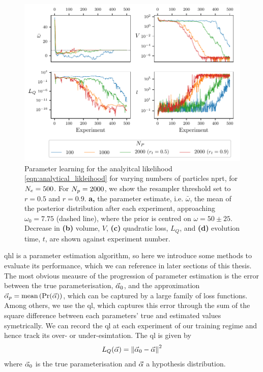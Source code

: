 \begin{figure}[t]
    \centering
    \includegraphics{algorithms/figures/params.pdf}
    \caption[Parameter learning varying number of particles]{
        Parameter learning for the analyitcal \gls{likelihood} \cref{eqn:analytical_likleihood}
        for varying numbers of \glspl{particle} \gls{nprt}, for $N_e=500$. 
        For $N_p=2000$, we show the resampler threshold set to $r=0.5$ and $r=0.9$. 
        \textbf{a,} the parameter estimate, i.e. $\bar{\omega}$, the mean of the posterior distribution after each experiment, 
        approaching $\omega_0=7.75$ (dashed line), where the prior is centred on $\omega=50 \pm 25$. 
        Decrease in \textbf{(b)} volume, $V$, \textbf{(c)} quadratic loss, $L_Q$, 
        and \textbf{(d)} evolution time, $t$, are shown against \gls{experiment} number.
        \figtableref
    }
    \label{fig:param_learning_vary_particles}
\end{figure}


\gls{qhl} is a parameter estimation algorithm, so here we introduce some methods to evaluate its performance, 
    which we can reference in later sections of this thesis. 
The most obvious meausre of the progression of parameter estimation is the error between the true parameterisation, 
    $\vec{\alpha}_0$, and the approximation $\vec{\alpha}_p = \textrm{mean} \left( \Pr(\vec{\alpha}) \right)$,
    which can be captured by a large family of loss functions. 
Among others, we use the \gls{ql}, which captures this error through the sum of the square difference between 
    each parameters' true and estimated values symetrically.
We can record the \gls{ql} at each \gls{experiment} of our training regime and hence track its over- or under-esimtation. 
The \gls{ql} is given by 
    \begin{equation}
        \label{eqn:quadratic_loss}
        L_{Q}(\vec{\alpha}) = \left\| \vec{\alpha}_0 - \vec{\alpha} \right\|^2
    \end{equation}
    where $\vec{\alpha}_0$ is the true parameterisation and $\vec{\alpha}$ a hypothesis distribution.
\par 

